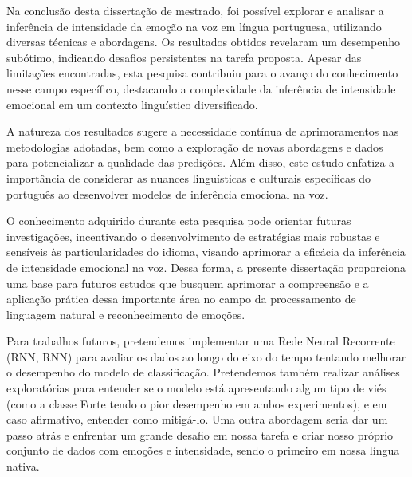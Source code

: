 
Na conclusão desta dissertação de mestrado, foi possível explorar e analisar a inferência de intensidade da emoção na voz em língua portuguesa, utilizando diversas técnicas e abordagens. Os resultados obtidos revelaram um desempenho subótimo, indicando desafios persistentes na tarefa proposta. Apesar das limitações encontradas, esta pesquisa contribuiu para o avanço do conhecimento nesse campo específico, destacando a complexidade da inferência de intensidade emocional em um contexto linguístico diversificado.

A natureza dos resultados sugere a necessidade contínua de aprimoramentos nas metodologias adotadas, bem como a exploração de novas abordagens e dados para potencializar a qualidade das predições. Além disso, este estudo enfatiza a importância de considerar as nuances linguísticas e culturais específicas do português ao desenvolver modelos de inferência emocional na voz.

O conhecimento adquirido durante esta pesquisa pode orientar futuras investigações, incentivando o desenvolvimento de estratégias mais robustas e sensíveis às particularidades do idioma, visando aprimorar a eficácia da inferência de intensidade emocional na voz. Dessa forma, a presente dissertação proporciona uma base para futuros estudos que busquem aprimorar a compreensão e a aplicação prática dessa importante área no campo da processamento de linguagem natural e reconhecimento de emoções.

Para trabalhos futuros, pretendemos implementar uma Rede Neural Recorrente (\acrlong{RNN}, \acrshort{RNN}) para avaliar os dados ao longo do eixo do tempo tentando melhorar o desempenho do modelo de classificação. Pretendemos também realizar análises exploratórias para entender se o modelo está apresentando algum tipo de viés (como a classe Forte tendo o pior desempenho em ambos experimentos), e em caso afirmativo, entender como mitigá-lo. Uma outra abordagem seria dar um passo atrás e enfrentar um grande desafio em nossa tarefa e criar nosso próprio conjunto de dados com emoções e intensidade, sendo o primeiro em nossa língua nativa.
